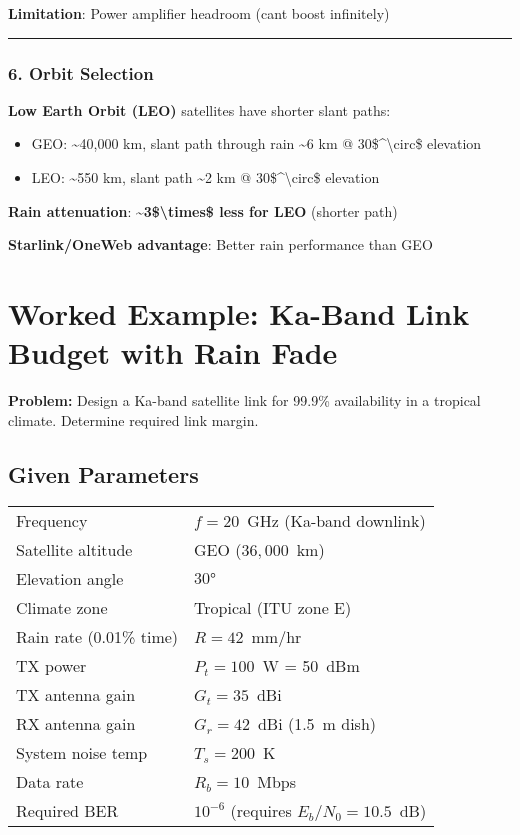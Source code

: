 \textbf{Limitation}: Power amplifier headroom (can\textquotesingle t
boost infinitely)

\begin{center}\rule{0.5\linewidth}{0.5pt}\end{center}

\subsubsection{6. Orbit Selection}\label{orbit-selection}

\textbf{Low Earth Orbit (LEO)} satellites have shorter slant paths:

\begin{itemize}
\tightlist
\item
  GEO: \textasciitilde40,000 km, slant path through rain
  \textasciitilde6 km @ 30\$\^{}\textbackslash circ\$ elevation
\item
  LEO: \textasciitilde550 km, slant path \textasciitilde2 km @
  30\$\^{}\textbackslash circ\$ elevation
\end{itemize}

\textbf{Rain attenuation}:
\textbf{\textasciitilde3\$\textbackslash times\$ less for LEO} (shorter
path)

\textbf{Starlink/OneWeb advantage}: Better rain performance than GEO

\section{Worked Example: Ka-Band Link Budget with Rain Fade}

\textbf{Problem:} Design a Ka-band satellite link for 99.9\% availability in a tropical climate. Determine required link margin.

\subsection*{Given Parameters}

\begin{tabular}{@{}ll@{}}
Frequency & $f = 20$~GHz (Ka-band downlink) \\
Satellite altitude & GEO ($36{,}000$~km) \\
Elevation angle & $30°$ \\
Climate zone & Tropical (ITU zone E) \\
Rain rate (0.01\% time) & $R = 42$~mm/hr \\
TX power & $P_t = 100$~W = 50~dBm \\
TX antenna gain & $G_t = 35$~dBi \\
RX antenna gain & $G_r = 42$~dBi (1.5~m dish) \\
System noise temp & $T_s = 200$~K \\
Data rate & $R_b = 10$~Mbps \\
Required BER & $10^{-6}$ (requires $E_b/N_0 = 10.5$~dB) \\
\end{tabular}

